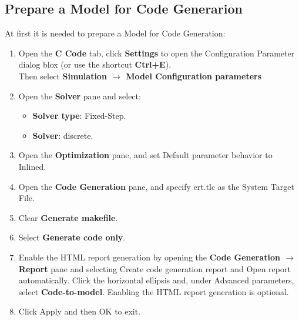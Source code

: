\documentclass[12pt,a4paper]{report}
\begin{document}
\subsection{Prepare a Model for Code Generarion}
At first it is needed to prepare a Model for Code Generation:
\begin{enumerate}
	\item Open the \textbf{C Code} tab, click \textbf{Settings} to open the Configuration Parameter dialog blox (or use the shortcut \textbf{Ctrl+E}).\\
	Then select \textbf{Simulation $\to$ Model Configuration parameters}
	\item Open the \textbf{Solver} pane and select:
	\begin{itemize}
		\item \textbf{Solver type}: Fixed-Step.
		\item  \textbf{Solver}: discrete.
	\end{itemize}
	\item Open the \textbf{Optimization} pane, and set Default parameter behavior to Inlined.
	\item Open the \textbf{Code Generation} pane, and specify ert.tlc as the System Target File.
	\item Clear \textbf{Generate makefile}.
	\item Select \textbf{Generate code only}.
	\item Enable the HTML report generation by opening the \textbf{Code Generation $\to$ Report} pane and selecting Create code generation report and Open report automatically. Click the horizontal ellipsis and, under Advanced parameters, select \textbf{Code-to-model}. Enabling the HTML report generation is optional.
	\item Click Apply and then OK to exit.
\end{enumerate}
\end{document}
